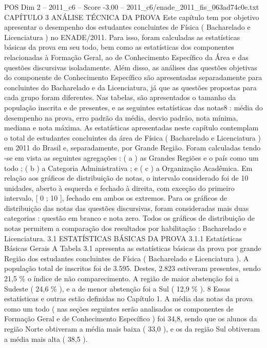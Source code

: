 \begin{textsample}{POS Dim 2 – 2011\_c6 – Score -3.00 – 2011\_c6/enade\_2011\_fis\_063ad74c0e.txt}  \label{ex:f2_pos_414}
CAPÍTULO 3 ANÁLISE TÉCNICA DA PROVA Este capítulo tem por objetivo apresentar o desempenho dos estudantes concluintes de Física ( Bacharelado e Licenciatura ) no ENADE/2011.
Para isso, foram calculadas as estatísticas básicas da prova em seu todo, bem como as estatísticas dos componentes relacionadas à Formação Geral, ao de Conhecimento Específico da Área e das questões discursivas isoladamente.
Além disso, as análises das questões objetivas do componente de Conhecimento Específico são apresentadas separadamente para concluintes do Bacharelado e da Licenciatura, já que as questões propostas para cada grupo foram diferentes.
Nas tabelas, são apresentados o tamanho da população inscrita e de presentes, e as seguintes estatísticas das notas8 : média do desempenho na prova, erro padrão da média, desvio padrão, nota mínima, mediana e nota máxima.
As estatísticas apresentadas neste capítulo contemplam o total de estudantes concluintes da área de Física ( Bacharelado e Licenciatura ) em 2011 do Brasil e, separadamente, por Grande Região.
Foram calculadas tendo -se em vista as seguintes agregações : ( a ) as Grandes Regiões e o país como um todo ; ( b ) a Categoria Administrativa ; e ( c ) a Organização Acadêmica.
Em relação aos gráficos de distribuição de notas, o intervalo considerado foi de 10 unidades, aberto à esquerda e fechado à direita, com exceção do primeiro intervalo, [ 0 ; 10 ], fechado em ambos os extremos.
Para os gráficos de distribuição das notas das questões discursivas, foram consideradas mais duas categorias : questão em branco e nota zero.
Todos os gráficos de distribuição de notas permitem a comparação dos resultados por habilitação : Bacharelado e Licenciatura. 3.1 ESTATÍSTICAS BÁSICAS DA PROVA 3.1.1 Estatísticas Básicas Gerais A Tabela 3.1 apresenta as estatísticas básicas da prova por grande Região dos estudantes concluintes de Física ( Bacharelado e Licenciatura ).
A população total de inscritos foi de 3.595.
Destes, 2.823 estiveram presentes, sendo 21,5 \% o índice de não comparecimento.
A região de maior abstenção foi a Sudeste ( 24,6 \% ), e a de menor abstenção foi a Sul ( 12,9 \% ). 8 Essas estatísticas e outras estão definidas no Capítulo 1.
A média das notas da prova como um todo ( nas seções seguintes serão analisados os componentes de Formação Geral e de Conhecimento Específico ) foi 34,8, sendo que os alunos da região Norte obtiveram a média mais baixa ( 33,0 ), e os da região Sul obtiveram a média mais alta ( 38,5 ).

\end{textsample}
